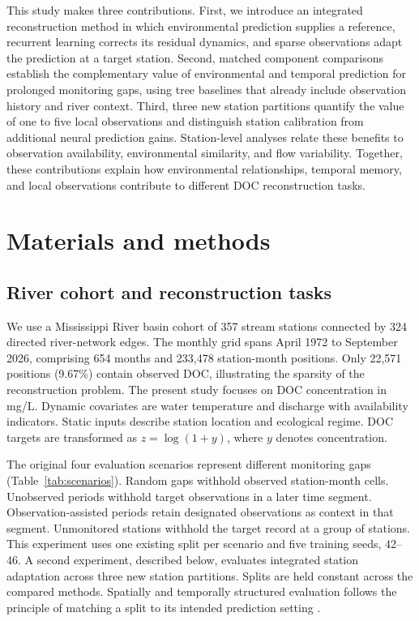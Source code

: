\documentclass[11pt]{article}
\begin{document}
This study makes three contributions. First, we introduce an integrated reconstruction method in which environmental prediction supplies a reference, recurrent learning corrects its residual dynamics, and sparse observations adapt the prediction at a target station. Second, matched component comparisons establish the complementary value of environmental and temporal prediction for prolonged monitoring gaps, using tree baselines that already include observation history and river context. Third, three new station partitions quantify the value of one to five local observations and distinguish station calibration from additional neural prediction gains. Station-level analyses relate these benefits to observation availability, environmental similarity, and flow variability. Together, these contributions explain how environmental relationships, temporal memory, and local observations contribute to different DOC reconstruction tasks.

\section{Materials and methods}

\subsection{River cohort and reconstruction tasks}
We use a Mississippi River basin cohort of 357 stream stations connected by 324 directed river-network edges. The monthly grid spans April 1972 to September 2026, comprising 654 months and 233,478 station-month positions. Only 22,571 positions (9.67\%) contain observed DOC, illustrating the sparsity of the reconstruction problem. The present study focuses on DOC concentration in mg/L. Dynamic covariates are water temperature and discharge with availability indicators. Static inputs describe station location and ecological regime. DOC targets are transformed as $z=\log(1+y)$, where $y$ denotes concentration.

The original four evaluation scenarios represent different monitoring gaps (Table~\ref{tab:scenarios}). Random gaps withhold observed station-month cells. Unobserved periods withhold target observations in a later time segment. Observation-assisted periods retain designated observations as context in that segment. Unmonitored stations withhold the target record at a group of stations. This experiment uses one existing split per scenario and five training seeds, 42--46. A second experiment, described below, evaluates integrated station adaptation across three new station partitions. Splits are held constant across the compared methods. Spatially and temporally structured evaluation follows the principle of matching a split to its intended prediction setting \citep{roberts2017}.
\end{document}
